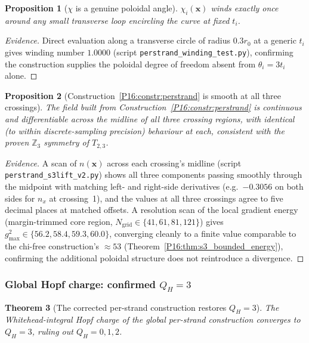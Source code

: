\documentclass[11pt,a4paper]{article}
\newtheorem{theorem}{Theorem}[section]
\newtheorem{proposition}[theorem]{Proposition}
\theoremstyle{definition}\newtheorem{definition}[theorem]{Definition}
\theoremstyle{remark}
\theoremstyle{definition}\newtheorem{construction}[theorem]{Construction}
\newcommand{\QH}{Q_H}
\begin{document}
\begin{proposition}[$\chi$ is a genuine poloidal angle]
\label{P16:prop:chi_winds}
$\chi_i(\mathbf{x})$ winds exactly once around any small transverse
loop encircling the curve at fixed $t_i$.
\end{proposition}

\begin{proof}[Evidence]
Direct evaluation along a transverse circle of radius $0.3r_0$ at a
generic $t_i$ gives winding number $1.0000$ (script
\texttt{perstrand\_winding\_test.py}), confirming the construction
supplies the poloidal degree of freedom absent from $\theta_i=3t_i$
alone.
\end{proof}

\begin{proposition}[Construction~\ref{P16:constr:perstrand} is smooth at
  all three crossings]
\label{P16:prop:perstrand_smooth}
The field built from Construction~\ref{P16:constr:perstrand} is
continuous and differentiable across the midline of all three
crossing regions, with identical (to within discrete-sampling
precision) behaviour at each, consistent with the proven
$\mathbb{Z}_3$ symmetry of $T_{2,3}$.
\end{proposition}

\begin{proof}[Evidence]
A scan of $n(\mathbf{x})$ across each crossing's midline (script
\texttt{perstrand\_s3lift\_v2.py}) shows all three components passing
smoothly through the midpoint with matching left- and right-side
derivatives (e.g.\ $-0.3056$ on both sides for $n_x$ at crossing~1),
and the values at all three crossings agree to five decimal places at
matched offsets. A resolution scan of the local gradient energy
(margin-trimmed core region, $N_{\mathrm{grid}}\in\{41,61,81,121\}$)
gives $g^2_{\max}\in\{56.2,58.4,59.3,60.0\}$, converging cleanly to a
finite value comparable to the chi-free construction's $\approx53$
(Theorem~\ref{P16:thm:s3_bounded_energy}), confirming the additional
poloidal structure does not reintroduce a divergence.
\end{proof}

\subsubsection{Global Hopf charge: confirmed $\QH=3$}

\begin{theorem}[The corrected per-strand construction restores $\QH=3$]
\label{P16:thm:perstrand_charge_three}
The Whitehead-integral Hopf charge of the global per-strand
construction converges to $\QH=3$, ruling out $\QH=0,1,2$.
\end{theorem}
\end{document}
